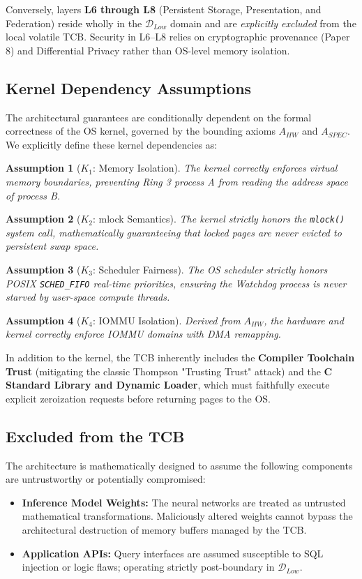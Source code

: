 \documentclass[conference]{IEEEtran}
\newtheorem{assumption}{Assumption}
\begin{document}
Conversely, layers \textbf{L6 through L8} (Persistent Storage, Presentation, and Federation) reside wholly in the $\mathcal{D}_{Low}$ domain and are \textit{explicitly excluded} from the local volatile TCB. Security in L6--L8 relies on cryptographic provenance (Paper 8) and Differential Privacy rather than OS-level memory isolation.

\subsection{Kernel Dependency Assumptions}
The architectural guarantees are conditionally dependent on the formal correctness of the OS kernel, governed by the bounding axioms $A_{HW}$ and $A_{SPEC}$. We explicitly define these kernel dependencies as:
\begin{assumption}[$K_1$: Memory Isolation] 
The kernel correctly enforces virtual memory boundaries, preventing Ring 3 process A from reading the address space of process B. 
\end{assumption}
\begin{assumption}[$K_2$: mlock Semantics] 
The kernel strictly honors the \texttt{mlock()} system call, mathematically guaranteeing that locked pages are never evicted to persistent swap space. 
\end{assumption}
\begin{assumption}[$K_3$: Scheduler Fairness] 
The OS scheduler strictly honors POSIX \texttt{SCHED\_FIFO} real-time priorities, ensuring the Watchdog process is never starved by user-space compute threads. 
\end{assumption}
\begin{assumption}[$K_4$: IOMMU Isolation]
Derived from $A_{HW}$, the hardware and kernel correctly enforce IOMMU domains with DMA remapping.
\end{assumption}

In addition to the kernel, the TCB inherently includes the \textbf{Compiler Toolchain Trust} (mitigating the classic Thompson "Trusting Trust" attack) and the \textbf{C Standard Library and Dynamic Loader}, which must faithfully execute explicit zeroization requests before returning pages to the OS.

\subsection{Excluded from the TCB}
The architecture is mathematically designed to assume the following components are untrustworthy or potentially compromised:
\begin{itemize}
    \item \textbf{Inference Model Weights:} The neural networks are treated as untrusted mathematical transformations. Maliciously altered weights cannot bypass the architectural destruction of memory buffers managed by the TCB. 
    \item \textbf{Application APIs:} Query interfaces are assumed susceptible to SQL injection or logic flaws; operating strictly post-boundary in $\mathcal{D}_{Low}$.
\end{itemize}
\end{document}
